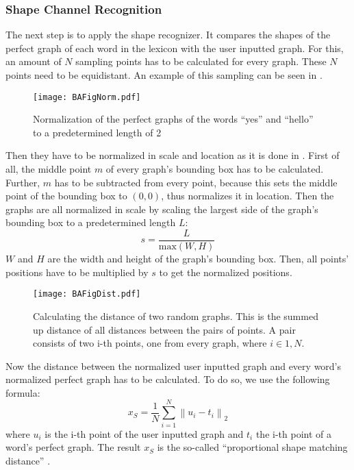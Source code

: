 \subsubsection{Shape Channel Recognition}
\label{normalize}
The next step is to apply the shape recognizer. It compares the shapes of the perfect graph of each word in the lexicon with the user inputted graph. For this, an amount of $N$ sampling points has to be calculated for every graph. These $N$ points need to be equidistant. An example of this sampling can be seen in .
\begin{figure}[H]
    \centering
    \texttt{[image: BAFigNorm.pdf]}
    \caption{Normalization of the perfect graphs of the words ``yes'' and ``hello'' to a predetermined length of 2}
    \label{fig:Norm}
\end{figure}
Then they have to be normalized in scale and location as it is done in . First of all, the middle point $m$ of every graph's bounding box has to be calculated. Further, $m$ has to be subtracted from every point, because this sets the middle point of the bounding box to $(0,0)$, thus normalizes it in location. Then the graphs are all normalized in scale by scaling the largest side of the graph's bounding box to a predetermined length $L$: 
\begin{equation}
    s = \frac{L}{\text{max}(W,H)}
\end{equation}
$W$ and $H$ are the width and height of the graph's bounding box.  Then, all points' positions have to be multiplied by $s$ to get the normalized positions. 
\begin{figure}[H]
    \centering
    \texttt{[image: BAFigDist.pdf]}
    \caption{Calculating the distance of two random graphs. This is the summed up distance of all distances between the pairs of points. A pair consists of two i-th points, one from every graph, where $i \in {1,N}$. }
    \label{fig:Distance}
\end{figure}
Now the distance between the normalized user inputted graph and every word's normalized perfect graph has to be calculated. To do so, we use the following formula:
\begin{equation}
    x_S = \frac{1}{N}\sum_{i = 1}^{N}\left\lVert u_i - t_i\right\rVert_2
\end{equation}
where $u_i$ is the i-th point of the user inputted graph and $t_i$ the i-th point of a word's perfect graph. The result $x_S$ is the so-called ``proportional shape matching distance'' \cite{Kristensson2004SHARK2AL}.\\

